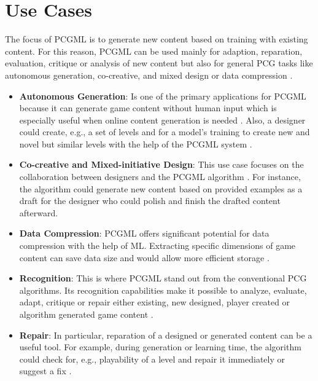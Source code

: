 \documentclass[MGS,Master,english]{twbook}%
\begin{document}
\section{Use Cases}
The focus of \ac{PCGML} is to generate new content based on training with existing content. For this reason, \ac{PCGML} can be used mainly for adaption, reparation, evaluation, critique or analysis of new content but also for general \ac{PCG} tasks like autonomous generation, co-creative, and mixed design or data compression \cite{pcgml::paper}.
\begin{itemize}
	\item \textbf{Autonomous Generation}: Is one of the primary applications for \ac{PCGML} because it can generate game content without human input which is especially useful when online content generation is needed \cite{pcgml::paper}. Also, a designer could create, e.g., a set of levels and for a model's training to create new and novel but similar levels with the help of the \ac{PCGML} system \cite{pcgml::paper}.
	\item \textbf{Co-creative and Mixed-initiative Design}: This use case focuses on the collaboration between designers and the \ac{PCGML} algorithm \cite{pcgml::paper}. For instance, the algorithm could generate new content based on provided examples as a draft for the designer who could polish and finish the drafted content afterward.
	\item \textbf{Data Compression}: \ac{PCGML} offers significant potential for data compression with the help of \ac{ML}. Extracting specific dimensions of game content can save data size and would allow more efficient storage \cite{pcgml::paper}.
	\item \textbf{Recognition}: This is where \ac{PCGML} stand out from the conventional \ac{PCG} algorithms. Its  recognition capabilities make it possible to analyze, evaluate, adapt, critique or repair either existing, new designed, player created or algorithm generated game content \cite{pcgml::paper}. 
	\item \textbf{Repair}: In particular, reparation of a designed or generated content can be a useful tool. For example, during generation or learning time, the algorithm could check for, e.g., playability of a level and repair it immediately or suggest a fix \cite{pcgml::paper}.
\end{itemize}
\end{document}
